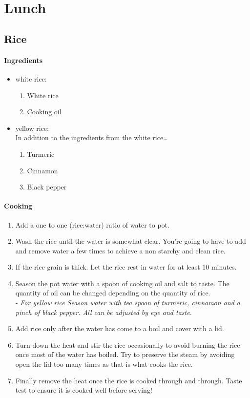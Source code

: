 \chapter{Lunch}

\section{Rice}
\subsubsection{Ingredients}
\begin{itemize}
    \item white rice:
    \begin{enumerate}
        \item White rice
        \item Cooking oil
    \end{enumerate}
    \item yellow rice:\\ In addition to the ingredients from the white rice\ldots
    \begin{enumerate}
        \item Turmeric
        \item Cinnamon
        \item Black pepper
    \end{enumerate}
\end{itemize}

\subsubsection{Cooking}
\begin{enumerate}
    \item Add a one to one (rice:water) ratio of water to pot.
    \item Wash the rice until the water is somewhat clear. You're going to have to add and remove water a few times to achieve a non starchy and clean rice.
    \item If the rice grain is thick. Let the rice rest in water for at least 10 minutes.
    \item Season the pot water with a spoon of cooking oil and salt to taste. The quantity of oil can be changed depending on the quantity of rice.\\
        - \textit{For yellow rice Season water with tea spoon of turmeric, cinnamon and a pinch of black pepper. All can be adjusted by eye and taste.}
    \item Add rice only after the water has come to a boil and cover with a lid.
    \item Turn down the heat and stir the rice occasionally to avoid burning the rice once most of the water has boiled. Try to preserve the steam by avoiding open the lid too many times as that is what cooks the rice.
    \item Finally remove the heat once the rice is cooked through and through. Taste test to ensure it is cooked well before serving!
\end{enumerate}


